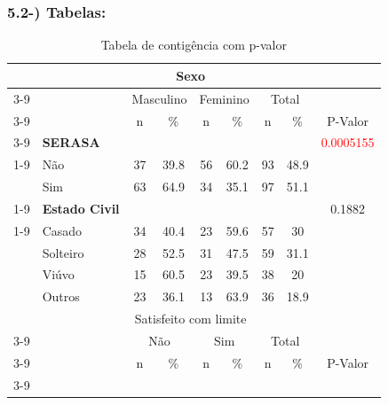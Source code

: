 \documentclass[]{article}
\begin{document}
\subsubsection{5.2-) Tabelas:}\label{tabelas}

\begin{table}[h!]
    \centering
        \caption{Tabela de contigência com p-valor}
        \begin{tabular}{c c c c c c c c c}
            \toprule
            \midrule
                & & \multicolumn{4}{c}{Sexo}\\ \cmidrule{3-9}
                && \multicolumn{2}{c}{Masculino} & \multicolumn{2}{c}{Feminino} & \multicolumn{2}{c}{Total} \\ \cmidrule{3-9}
                && n & \% & n & \% & n & \% & P-Valor \\ \cmidrule{3-9}
                \multicolumn{1}{c}{\multirow{5}{*}}   &
                \multicolumn{1}{l}{\textbf{SERASA}} &  &  &  & & &  & \textcolor{red}{0.0005155} \\ \cmidrule{1-9}
                \multicolumn{1}{c}{}    &
                \multicolumn{1}{l}{Não} & 37 & 39.8 & 56 & 60.2 & 93 & 48.9 &  \\
                \multicolumn{1}{c}{}    &
                \multicolumn{1}{l}{Sim}& 63 & 64.9 & 34 & 35.1 & 97 & 51.1  \\ \cmidrule{1-9} &
                \multicolumn{1}{l}{\textbf{Estado Civil}} &  &  &  & & &  & 0.1882 \\ \cmidrule{1-9}                
                \multicolumn{1}{c}{}    &
                \multicolumn{1}{l}{Casado} & 34 & 40.4 & 23 & 59.6 & 57 & 30 &  \\
                \multicolumn{1}{c}{}    &   
                \multicolumn{1}{l}{Solteiro} & 28 & 52.5 & 31 & 47.5 & 59 & 31.1 &  \\
                \multicolumn{1}{c}{}    &
                \multicolumn{1}{l}{Viúvo} & 15 & 60.5 & 23 & 39.5 & 38 & 20   \\
                \multicolumn{1}{c}{}    &
                \multicolumn{1}{l}{Outros} & 23 & 36.1 & 13 & 63.9& 36 & 18.9   \\  
                \toprule
                \midrule 
                & & \multicolumn{4}{c}{Satisfeito com limite}\\ \cmidrule{3-9}
                && \multicolumn{2}{c}{Não} & \multicolumn{2}{c}{Sim} & \multicolumn{2}{c}{Total}  \\ \cmidrule{3-9}
                && n & \% & n & \% & n & \% & P-Valor \\ \cmidrule{3-9}

\end{tabular}
\end{table}
\end{document}
